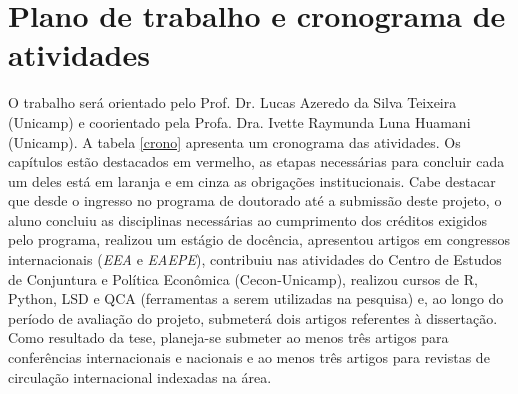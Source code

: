 \section{Plano de trabalho e cronograma de atividades}\label{cronograma}


O trabalho será orientado pelo Prof. Dr. Lucas Azeredo da Silva Teixeira (Unicamp) e coorientado pela Profa. Dra. Ivette Raymunda Luna Huamani (Unicamp). 
A tabela \ref{crono} apresenta um cronograma das atividades. Os capítulos estão destacados em vermelho, as etapas necessárias para concluir cada um deles está em laranja e em cinza as obrigações institucionais.
Cabe destacar que desde o ingresso no programa de doutorado até a
submissão deste projeto, o aluno concluiu as disciplinas necessárias ao cumprimento dos créditos exigidos pelo programa, realizou um estágio de docência, apresentou artigos em congressos
internacionais (\textit{EEA} e \textit{EAEPE}), contribuiu nas atividades do Centro de Estudos de Conjuntura e Política Econômica (Cecon-Unicamp), realizou cursos de R, Python, LSD e QCA (ferramentas a serem utilizadas na pesquisa) e, ao longo do período de avaliação do projeto, submeterá dois artigos referentes à dissertação.
 Como resultado da tese, planeja-se submeter ao menos três artigos para conferências internacionais e nacionais e ao menos três artigos para revistas de circulação internacional indexadas na área.




 
 
\begin{comment}

\end{comment}




